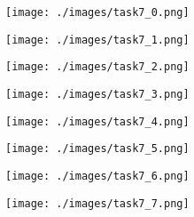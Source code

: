 \begin{figure}[!ht]
    \centering
    \texttt{[image: ./images/task7\_0.png]}
\end{figure}

\begin{figure}[!ht]
    \centering
    \texttt{[image: ./images/task7\_1.png]}
\end{figure}

\begin{figure}[!ht]
    \centering
    \texttt{[image: ./images/task7\_2.png]}
\end{figure}

\begin{figure}[!ht]
    \centering
    \texttt{[image: ./images/task7\_3.png]}
\end{figure}

\begin{figure}[!ht]
    \centering
    \texttt{[image: ./images/task7\_4.png]}
\end{figure}

\begin{figure}[!ht]
    \centering
    \texttt{[image: ./images/task7\_5.png]}
\end{figure}

\begin{figure}[!ht]
    \centering
    \texttt{[image: ./images/task7\_6.png]}
\end{figure}

\begin{figure}[!ht]
    \centering
    \texttt{[image: ./images/task7\_7.png]}
\end{figure}
